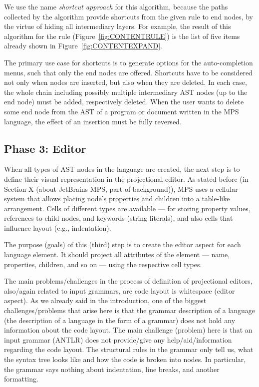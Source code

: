 We use the name \emph{shortcut approach} for this algorithm, because the paths collected by the algorithm provide shortcuts from the given rule to end nodes, by the virtue of hiding all intermediary layers.
For example, the result of this algorithm for the  rule (Figure~\ref{fig:CONTENTRULE}) is the list of five items already shown in Figure~\ref{fig:CONTENTEXPAND}.

The primary use case for shortcuts is to generate options for the auto-completion menus, such that only the end nodes are offered.
Shortcuts have to be considered not only when nodes are inserted, but also when they are deleted.
In each case, the whole chain including possibly multiple intermediary AST nodes (up to the end node) must be added, respectively deleted.
When the user wants to delete some end node from the AST of a program or document written in the MPS language, the effect of an insertion must be fully reversed.








\subsection{Phase 3: Editor}


When all types of AST nodes in the language are created, the next step is to define their visual representation in the projectional editor.
As stated before (in Section X (about JetBrains MPS, part of background)), MPS uses a cellular system that allows placing node's properties and children into a table-like arrangement.
Cells of different types are available --- for storing property values, references to child nodes, and keywords (string literals), and also cells that influence layout (e.g., indentation).

The purpose (goals) of this (third) step is to create the editor aspect for each language element.
It should project all attributes of the element --- name, properties, children, and so on --- using the respective cell types.

The main problems/challenges in the process of definition of projectional editors, also/again related to input grammars, are code layout is whitespace (editor aspect).
As we already said in the introduction, one of the biggest challenges/problems that arise here is that the grammar description of a language (the description of a language in the form of a grammar) does not hold any information about the code layout.
The main challenge (problem) here is that an input grammar (ANTLR) does not provide/give any help/aid/information regarding the code layout.
The structural rules in the grammar only tell us, what the syntax tree looks like and how the code is broken into nodes.
In particular, the grammar says nothing about indentation, line breaks, and another formatting.

